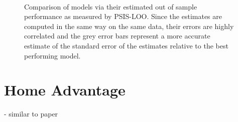 \begin{figure}
	 \\
	\caption{Comparison of models via their estimated out of sample performance as measured by PSIS-LOO. Since the estimates are computed in the same way on the same data, their errors are highly correlated and the grey error bars represent a more accurate estimate of the standard error of the estimates relative to the best performing model.}
	\label{fig:psis-loos}
\end{figure}

\section{Home Advantage}

- similar to paper

